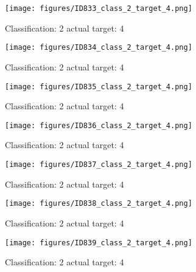 \begin{figure}[h!]
\begin{center}
\texttt{[image: figures/ID833\_class\_2\_target\_4.png]}
\end{center}
\caption{ Classification: 2 actual target: 4}
\label{fig:ID833_class_2_target_4}
\end{figure}
\begin{figure}[h!]
\begin{center}
\texttt{[image: figures/ID834\_class\_2\_target\_4.png]}
\end{center}
\caption{ Classification: 2 actual target: 4}
\label{fig:ID834_class_2_target_4}
\end{figure}
\begin{figure}[h!]
\begin{center}
\texttt{[image: figures/ID835\_class\_2\_target\_4.png]}
\end{center}
\caption{ Classification: 2 actual target: 4}
\label{fig:ID835_class_2_target_4}
\end{figure}
\begin{figure}[h!]
\begin{center}
\texttt{[image: figures/ID836\_class\_2\_target\_4.png]}
\end{center}
\caption{ Classification: 2 actual target: 4}
\label{fig:ID836_class_2_target_4}
\end{figure}
\begin{figure}[h!]
\begin{center}
\texttt{[image: figures/ID837\_class\_2\_target\_4.png]}
\end{center}
\caption{ Classification: 2 actual target: 4}
\label{fig:ID837_class_2_target_4}
\end{figure}
\begin{figure}[h!]
\begin{center}
\texttt{[image: figures/ID838\_class\_2\_target\_4.png]}
\end{center}
\caption{ Classification: 2 actual target: 4}
\label{fig:ID838_class_2_target_4}
\end{figure}
\begin{figure}[h!]
\begin{center}
\texttt{[image: figures/ID839\_class\_2\_target\_4.png]}
\end{center}
\caption{ Classification: 2 actual target: 4}
\label{fig:ID839_class_2_target_4}
\end{figure}
